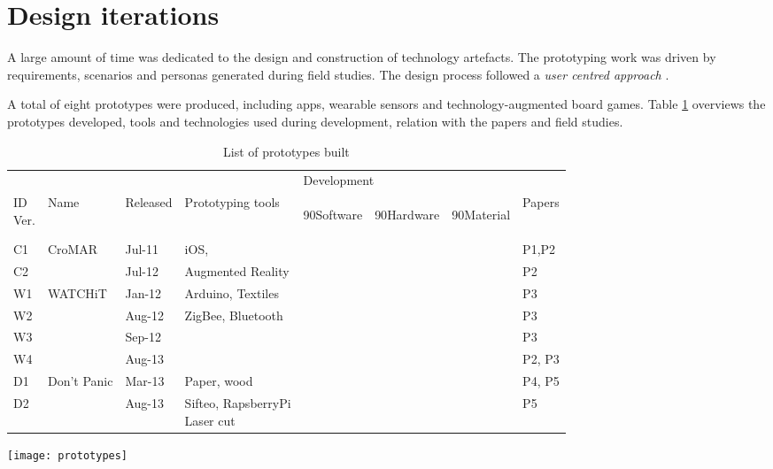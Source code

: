 \section{Design iterations}\label{design-iterations}

A large amount of time was dedicated to the design and construction of technology artefacts. The prototyping work was driven by requirements, scenarios and personas generated during field studies. The design process followed a \emph{user centred approach} \autocites{MAGUIRE:2001dp}{Gulliksen:2003hd}.

A total of eight prototypes were produced, including apps, wearable sensors and technology-augmented board games. Table \ref{prototypes} overviews the prototypes developed, tools and technologies used during development, relation with the papers and field studies.
\begin{table}
	[!p] \centering \caption{List of prototypes built} \label{prototypes} 
	\begin{threeparttable}
		\begin{tabular}{@{}llllllll@{}} 
			\toprule 
			& & & & \multicolumn{3}{l}{Development}  \\
			\cline{5-7} \noalign{\smallskip} 
			\specialcell[b]{ID\\Ver.} & Name & Released & Prototyping tools & 
			\begin{turn}
				{90}Software
			\end{turn}
			& 
			\begin{turn}
				{90}Hardware
			\end{turn}
			& 
			\begin{turn}
				{90}Material
			\end{turn}
			& Papers \\
			\midrule \noalign{\smallskip} C1 & CroMAR & Jul-11 & iOS, & \textbullet & & & P1,P2 \\
			C2 & & Jul-12 & Augmented Reality & \textbullet & & & P2 \\
			\hline \noalign{\smallskip} W1 & WATCHiT & Jan-12 & Arduino, Textiles & \textbullet & \textbullet & & P3 \\
			W2 & & Aug-12 & ZigBee, Bluetooth & \textbullet & \textbullet & & P3 \\
			W3 & & Sep-12 & & \textbullet & \textbullet & & P3 \\
			W4 & & Aug-13 & & \textbullet & \textbullet & \textbullet & P2, P3 \\
			\hline \noalign{\smallskip} D1 & Don't Panic & Mar-13 & Paper, wood & & & \textbullet & P4, P5 \\
			D2 & & Aug-13 & \specialcell[t]{Sifteo, RapsberryPi\\Laser cut} & \textbullet & \textbullet & \textbullet & P5 \\
			\bottomrule 
		\end{tabular}
		\begin{tablenotes}
			\item 
			\texttt{[image: prototypes]} 
		\end{tablenotes}
	\end{threeparttable}
\end{table}

